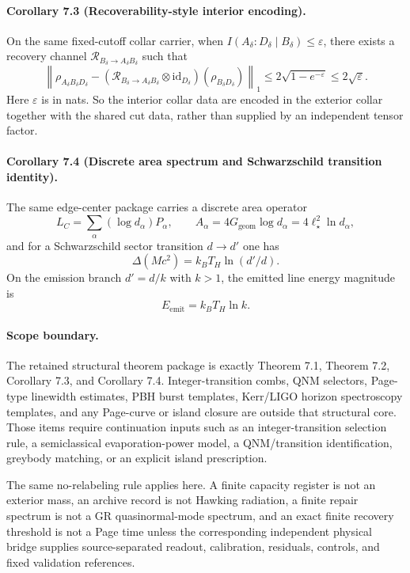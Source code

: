 \paragraph{\textbf{Corollary 7.3 (Recoverability-style interior encoding).}}
On the same fixed-cutoff collar carrier, when
\(I(A_\delta:D_\delta\mid B_\delta)\le\varepsilon\), there exists a recovery channel
\(\mathcal R_{B_\delta\to A_\delta B_\delta}\) such that
\[
\left\|
\rho_{A_\delta B_\delta D_\delta}
-
(\mathcal R_{B_\delta\to A_\delta B_\delta}\otimes \mathrm{id}_{D_\delta})(\rho_{B_\delta D_\delta})
\right\|_1
\le
2\sqrt{1-e^{-\varepsilon}}
\le2\sqrt{\varepsilon}.
\]
Here \(\varepsilon\) is in nats.
So the interior collar data are encoded in the exterior collar together with the shared cut data,
rather than supplied by an independent tensor factor.

\paragraph{\textbf{Corollary 7.4 (Discrete area spectrum and Schwarzschild transition identity).}}
The same edge-center package carries a discrete area operator
\[
L_C=\sum_\alpha (\log d_\alpha)P_\alpha,
\qquad
A_\alpha=4G_{\mathrm{geom}}\log d_\alpha=4\ell_\star^2\ln d_\alpha,
\]
and for a Schwarzschild sector transition \(d\to d'\) one has
\[
\Delta(Mc^2)=k_B T_H\ln(d'/d).
\]
On the emission branch \(d'=d/k\) with \(k>1\), the emitted line energy magnitude is
\[
E_{\mathrm{emit}}=k_B T_H\ln k.
\]

\paragraph{\textbf{Scope boundary.}}
The retained structural theorem package is exactly Theorem 7.1, Theorem 7.2, Corollary 7.3, and
Corollary 7.4. Integer-transition combs, QNM selectors, Page-type linewidth estimates, PBH burst
templates, Kerr/LIGO horizon spectroscopy templates, and any Page-curve or island closure are
outside that structural core. Those items require continuation inputs such as an integer-transition
selection rule, a semiclassical evaporation-power model, a QNM/transition identification, greybody
matching, or an explicit island prescription.

The same no-relabeling rule applies here. A finite capacity register is not an
exterior mass, an archive record is not Hawking radiation, a finite repair
spectrum is not a GR quasinormal-mode spectrum, and an exact finite recovery
threshold is not a Page time unless the corresponding independent physical
bridge supplies source-separated readout, calibration, residuals, controls, and
fixed validation references.


